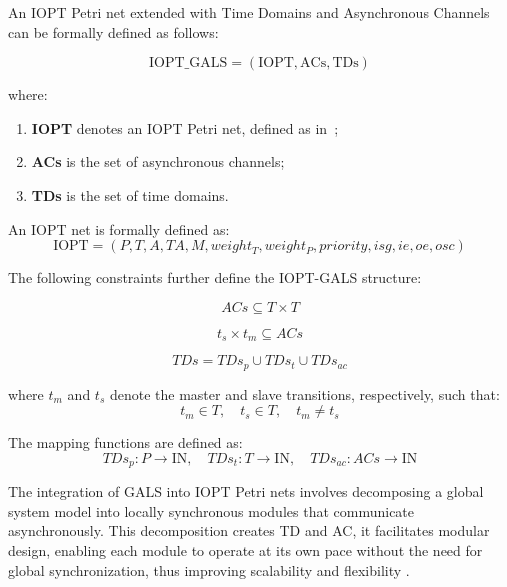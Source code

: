 An IOPT Petri net extended with Time Domains and Asynchronous Channels can be formally defined as follows:

\begin{equation}
\text{IOPT\_GALS} = (\text{IOPT}, \text{ACs}, \text{TDs})
\end{equation}

where:
\begin{enumerate}
    \item \textbf{IOPT} denotes an IOPT Petri net, defined as in~\cite{iopttools};
    \item \textbf{ACs} is the set of asynchronous channels;
    \item \textbf{TDs} is the set of time domains.
\end{enumerate}

An IOPT net is formally defined as:
\begin{equation}
\text{IOPT} = (P, T, A, TA, M, weight_T, weight_P, priority, isg, ie, oe, osc)
\end{equation}

The following constraints further define the IOPT-GALS structure:

\begin{equation}
ACs \subseteq T \times T
\end{equation}

\begin{equation}
t_s \times t_m \subseteq ACs
\end{equation}

\begin{equation}
TDs = TDs_p \cup TDs_t \cup TDs_{ac}
\end{equation}

\noindent where \( t_m \) and \( t_s \) denote the master and slave transitions, respectively, such that:
\[
t_m \in T, \quad t_s \in T, \quad t_m \neq t_s
\]

\noindent The mapping functions are defined as:
\[
TDs_p : P \rightarrow \text{IN}, \quad TDs_t : T \rightarrow \text{IN}, \quad TDs_{ac} : ACs \rightarrow \text{IN}
\]



The integration of GALS into IOPT Petri nets involves decomposing a global system model into locally synchronous modules that communicate asynchronously. This decomposition creates TD and AC, it facilitates modular design, enabling each module to operate at its own pace without the need for global synchronization, thus improving scalability and flexibility \cite{galsactd}.




